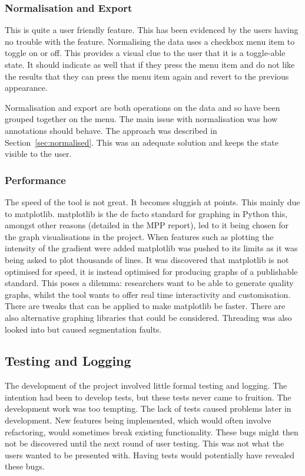 \subsubsection{Normalisation and Export}

This is quite a user friendly feature.  This has been evidenced by the users having no trouble with the feature.  Normalising the data uses a checkbox menu item to toggle on or off.  This provides a visual clue to the user that it is a toggle-able state.  It should indicate as well that if they press the menu item and do not like the results that they can press the menu item again and revert to the previous appearance.

Normalisation and export are both operations on the data and so have been grouped together on the menu.  The main issue with normalisation was how annotations should behave.  The approach was described in Section~\ref{sec:normalised}.  This was an adequate solution and keeps the state visible to the user.

\subsubsection{Performance}

The speed of the tool is not great.  It becomes sluggish at points.  This mainly due to matplotlib.  matplotlib is the de facto standard for graphing in Python this, amongst other reasons (detailed in the MPP report), led to it being chosen for the graph visualisations in the project.  When features such as plotting the intensity of the gradient were added matplotlib was pushed to its limits as it was being asked to plot thousands of lines.  It was discovered that matplotlib is not optimised for speed, it is instead optimised for producing graphs of a publishable standard.  This poses a dilemma: researchers want to be able to generate quality graphs, whilst the tool wants to offer real time interactivity and customisation.  There are tweaks that can be applied to make matplotlib be faster. There are also alternative graphing libraries that could be considered.  Threading was also looked into but caused segmentation faults.

\subsection{Testing and Logging}

The development of the project involved little formal testing and logging.  The intention had been to develop tests, but these tests never came to fruition.  The development work was too tempting. The lack of tests caused problems later in development.  New features being implemented, which would often involve refactoring, would sometimes break existing functionality.  These bugs might then not be discovered until the next round of user testing.  This was not what the users wanted to be presented with.  Having tests would potentially have revealed these bugs.


